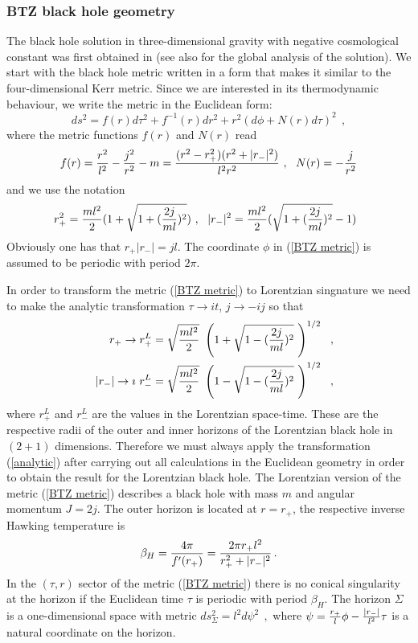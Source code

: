 \documentclass[12pt]{article}
\begin{document}
\subsubsection{BTZ black hole geometry}  
The black hole solution in three-dimensional gravity with negative cosmological constant was first obtained in \cite{Banados:1992wn} (see also  \cite{Banados:1992gq} for the global analysis of the solution).                           
We start with the black hole metric written in a form 
that makes it similar to the four-dimensional Kerr metric. 
Since we are interested in its thermodynamic behaviour,
we write the metric in the Euclidean form:
\begin{equation}
ds^2=f(r)d\tau^2+f^{-1}(r) dr^2+r^2(d\phi+N(r)d\tau)^2~~,
\label{BTZ metric}
\end{equation}
where the metric functions $f(r)$ and $N(r)$ read
\begin{equation}
f(r)={r^2\over l^2}-{j^2\over r^2}-m={(r^2-r_+^2)(r^2+|r_-|^2)\over l^2 r^2}\, \, , \ \ N(r)=-{j\over r^2}
\label{BTZ metric function}
\end{equation}
and we use the notation
\begin{equation}
r^2_+={ml^2\over 2}(1+\sqrt{1+({2j\over m l})^2})~,
~~|r_-|^2={ml^2\over 2}(\sqrt{1+({2j\over m l})^2}-1)~~
\label{horizons}
\end{equation}
Obviously one has that $r_+|r_-|=jl$. The coordinate $\phi$ in (\ref{BTZ metric}) is assumed to be periodic with period $2\pi$.


In order to transform the metric (\ref{BTZ metric}) to Lorentzian  singnature we
need to make the analytic transformation
$\tau\rightarrow i t$, $j\rightarrow -ij$ so that
\begin{eqnarray}
&&r_+\rightarrow r^L_+=\sqrt{ml^2\over 2}~\left(1+\sqrt{1-({2j\over m l})^2}~\right)^{1/2}~~, \nonumber \\
&&|r_-|\rightarrow \imath ~r_-^L=\sqrt{ml^2\over 2}~\left(1-\sqrt{1-({2j\over m l})^2}~\right)^{1/2}~~,
\label{analytic}
\end{eqnarray}
where $r^L_+$ and $r^L_-$ are the values in the Lorentzian space-time. These 
are the  respective radii of the outer and inner horizons  of the 
Lorentzian  black hole in $(2+1)$ dimensions. Therefore
we must always apply the transformation (\ref{analytic}) after carrying out
all calculations in the Euclidean geometry  in order to
obtain the result for the Lorentzian  black hole.
The Lorentzian version of the metric (\ref{BTZ metric}) describes a black hole with mass $m$ and angular 
momentum $J=2j$.
The outer horizon is located at $r=r_+$, the respective  inverse Hawking temperature is 
\begin{equation}
\beta_H={4\pi\over f'(r_+)}={2\pi r_+ l^2 \over r^2_++|r_-|^2}\, .
\label{temperature}
\end{equation}
In the $(\tau , r)$ sector of the metric (\ref{BTZ metric}) there is 
no conical singularity at the horizon if the Euclidean time $\tau$ 
is periodic with period $\beta_H$. 
The horizon $\Sigma$ is a one-dimensional space with metric
$
ds^2_{\Sigma}=l^2d\psi^2~~,
$
where $\psi={r_+\over l} \phi-{|r_-|\over l^2}\tau$ is a natural coordinate on the horizon.
                            
\end{document}
